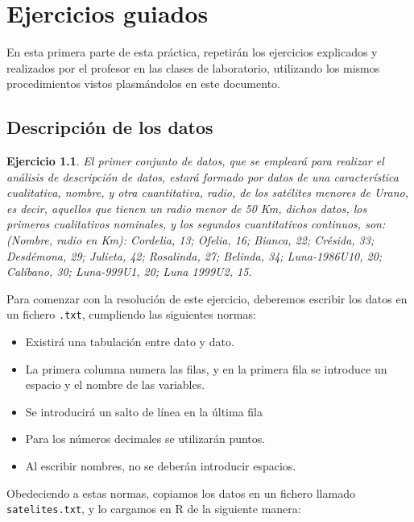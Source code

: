 \documentclass[12pt]{report}\usepackage[]{graphicx}\usepackage[dvipsnames]{xcolor}
\newtheorem{exercise}{Ejercicio}[section]
\begin{document}
	\chapter{Ejercicios guiados}\pagestyle{fancy}
	
		En esta primera parte de esta práctica, repetirán los ejercicios explicados y realizados por el profesor en las clases de laboratorio, utilizando los mismos procedimientos vistos plasmándolos en este documento. 
	
		\section{Descripción de los datos}
		
			\begin{exercise}
				El primer conjunto de datos, que se empleará para realizar el análisis de descripción de datos, estará formado por datos de una característica cualitativa, nombre, y otra cuantitativa, radio, de los satélites menores de Urano, es decir, aquellos que tienen un radio menor de 50 Km, dichos datos, los primeros cualitativos nominales, y los segundos cuantitativos continuos, son: (Nombre, radio en Km): Cordelia, 13; Ofelia, 16; Bianca, 22; Crésida, 33; Desdémona, 29; Julieta, 42; Rosalinda, 27; Belinda, 34; Luna-1986U10, 20; Calíbano, 30; Luna-999U1, 20; Luna 1999U2, 15.
			\end{exercise}
			
			Para comenzar con la resolución de este ejercicio, deberemos escribir los datos en un fichero \texttt{.txt}, cumpliendo las siguientes normas: 
			
			\begin{itemize}
				\item Existirá una tabulación entre dato y dato. 
				\item La primera columna numera las filas, y en la primera fila se introduce un espacio y el nombre de las variables. 
				\item Se introducirá un salto de línea en la última fila
				\item Para los números decimales se utilizarán puntos. 
				\item Al escribir nombres, no se deberán introducir espacios. 
			\end{itemize}
			
			Obedeciendo a estas normas, copiamos los datos en un fichero llamado \texttt{satelites.txt}, y lo cargamos en R de la siguiente manera: 
			
\end{document}
